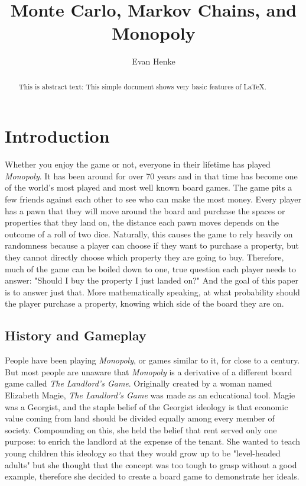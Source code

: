 \documentclass{article}
\begin{document}
\title{Monte Carlo, Markov Chains, and Monopoly}
\author{Evan Henke}

\maketitle

\begin{abstract}
This is abstract text: This simple document shows very basic features of
\LaTeX{}.
\end{abstract}


\section{Introduction}

Whether you enjoy the game or not, everyone in their lifetime has played  \textit{Monopoly}.  It has been around for over 70 years and in that time has become one of the world’s most played and most well known board games.  The game pits a few friends against each other to see who can make the most money.  Every player has a pawn that they will move around the board and purchase the spaces or properties that they land on, the distance each pawn moves depends on the outcome of a roll of two dice.  Naturally, this causes the game to rely heavily on randomness because a player can choose if they want to purchase a property, but they cannot directly choose which property they are going to buy. Therefore, much of the game can be boiled down to one, true question each player needs to answer: "Should I buy the property I just landed on?"  And the goal of this paper is to answer just that.  More mathematically speaking, at what probability should the player purchase a property, knowing which side of the board they are on.

\subsection{History and Gameplay}

People have been playing \textit{Monopoly}, or games similar to it, for close to a century.  But most people are unaware that \textit{Monopoly} is a derivative of a different board game called \textit{The Landlord’s Game}.  Originally created by a woman named Elizabeth Magie, \textit{The Landlord’s Game} was made as an educational tool.  Magie was a Georgist, and the staple belief of the Georgist ideology is that economic value coming from land should be divided equally among every member of society.  Compounding on this, she held the belief that rent served only one purpose: to enrich the landlord at the expense of the tenant.  She wanted to teach young children this ideology so that they would grow up to be "level-headed adults" but she thought that the concept was too tough to grasp without a good example, therefore she decided to create a board game to demonstrate her ideals. 
\end{document}
